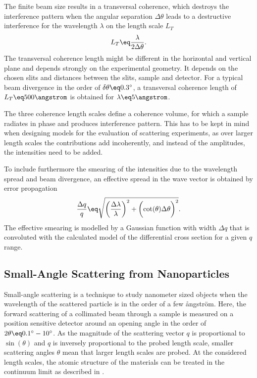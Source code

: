 \documentclass[\main/dresen_thesis.tex]{subfiles}
\begin{document}
The finite beam size results in a transversal coherence, which destroys the interference pattern when the angular separation $\Delta \theta$ leads to a destructive interference for the wavelength $\lambda$ on the length scale $L_T$
\begin{align}
  L_T \eq \frac{\lambda}{2 \Delta\theta}.
\end{align}
The transversal coherence length might be different in the horizontal and vertical plane and depends strongly on the experimental geometry.
It depends on the chosen slits and distances between the slits, sample and detector.
For a typical beam divergence in the order of $\delta \theta \eq 0.3^\circ$, a transversal coherence length of $L_T \eq 500 \angstrom$ is obtained for $\lambda \eq 5 \angstrom$.

The three coherence length scales define a coherence volume, for which a sample radiates in phase and produces interference pattern.
This has to be kept in mind when designing models for the evaluation of scattering experiments, as over larger length scales the contributions add incoherently, and instead of the amplitudes, the intensities need to be added.

To include furthermore the smearing of the intensities due to the wavelength spread and beam divergence, an effective spread in the wave vector is obtained by error propagation
\begin{align}
  \frac{\Delta q}{q} \eq \sqrt{\biggl( \frac{\Delta \lambda}{\lambda} \biggr)^2 + \biggl( \cot (\theta) \Delta \theta \biggr)^2}.
\end{align}
The effective smearing is modelled by a Gaussian function with width $\Delta q$ that is convoluted with the calculated model of the differential cross section for a given $q$ range.

\subsection{Small-Angle Scattering from Nanoparticles}\label{sec:theoreticalBackground:scattering:SASNanoparticles}
Small-angle scattering is a technique to study nanometer sized objects when the wavelength of the scattered particle is in the order of a few {\aa}ngstr\"om.
Here, the forward scattering of a collimated beam through a sample is measured on a position sensitive detector around an opening angle in the order of $2 \theta \eq 0.1^\circ - 10^\circ$.
As the magnitude of the scattering vector $q$ is proportional to $\sin(\theta)$ and $q$ is inversely proportional to the probed length scale, smaller scattering angles $\theta$ mean that larger length scales are probed.
At the considered length scales, the atomic structure of the materials can be treated in the continuum limit as described in .
\end{document}
